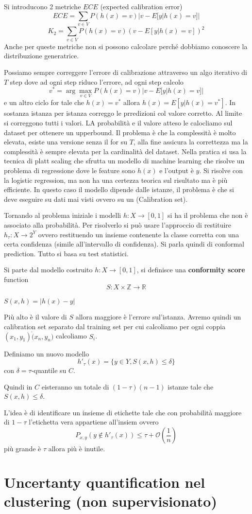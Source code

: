 Si introducono 2 metriche $ECE$ (expected calibration error) 
$$ECE = \sum_{v\in V}P(h(x)=v)|v-E[y|h(x)=v]|$$
$$K_2 = \sum_{v\in V}P(h(x)=v)(v-E[y|h(x)=v])^2$$
Anche per queste metriche non si possono calcolare perché dobbiamo conoscere la distribuzione generatrice.

Possiamo sempre correggere l'errore di calibrazione attraverso un algo iterativo di $T$ step dove ad ogni step 
riduco l'errore, ad ogni step calcolo 
$$v^\ast = \arg\max_{v\in V}P(h(x)=v)|v-E[y|h(x)=v]|$$ 
e un altro ciclo for tale che $h(x)=v^\ast $ allora $h(x)=E[y|h(x)=v^\ast]$. 
In sostanza istanza per istanza correggo le prredizioni col valore corretto. Al limite si correggono tutti i valori.
LA probabilità e il valore atteso le calocliamo sul dataset per ottenere un upperbound. Il problema è che 
la complessità è molto elevata, esiste una versione senza il for su $T$, alla fine assicura la correttezza 
ma la complessità è sempre elevata per la cardinalità del dataset. Nella pratica si usa la tecnica 
di platt scaling che sfrutta un modello di machine learning che risolve un problema di regressione 
dove le feature sono $h(x)$ e l'output è $y$. Si risolve con la logistic regression,
ma non ha una certezza teorica sul risultato ma è più efficiente.
In questo caso il modello dipende dalle istanze, il problema è che si deve eseguire 
su dati mai visti ovvero su un (Calibration set).

Tornando al problema iniziale i modelli $h:X\to [0,1]$  si ha il problema che non 
è associato alla probabilità. Per risolverlo si può usare l'approccio di 
restituire $h_\tau :X\to 2^Y$ ovvero restituendo un insieme contenente la classe 
corretta con una certa confidenza (simile all'intervallo di confidenza). Si parla 
quindi di conformal prediction. Tutto si basa su test statistici.

Si parte dal modello costruito $h:X\to [0,1]$, si definisce una \textbf{conformity score}
function 
$$S:X\times \mathbb{Z} \to \mathbb{R}$$
\begin{esempio}
    $S(x,h) = |h(x)-y|$
\end{esempio}
Più alto è il valore di $S$ allora maggiore è l'errore sul'istanza. Avremo 
quindi un calibration set separato dal training set per cui calcoliamo per ogni
coppia $(x_1,y_1)\dot(x_n,y_n)$ calcoliamo $S_i$.

Definiamo un nuovo modello 
$$h'_\tau(x)=\{y\in Y, S(x,h)\le \delta\}$$
con $\delta = \tau$-quantile su $C$. 

Quindi in $C$ eisteranno un totale di $(1-\tau)(n-1)$ istanze tale che $S(x,h)\le \delta$.

L'idea è di identificare un insieme di etichette tale che con probabilità maggiore
di $1-\tau$ l'etichetta vera appartiene all'insiem ovvero 
$$P_{x,y}(y\not \in h'_\tau(x))\le \tau + \mathcal{O}(\frac{1}{n})$$
più grande è $\tau$ allora più è inutile.



\section*{Uncertanty quantification nel clustering (non supervisionato)}


